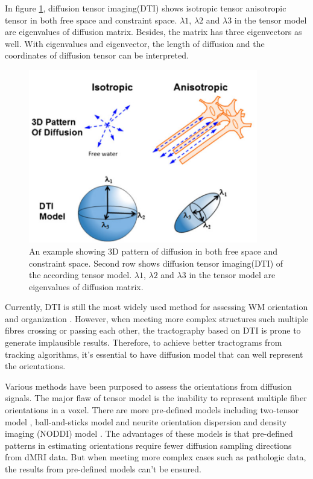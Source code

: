 In figure \ref*{fig:DTI}, diffusion tensor imaging(DTI) shows isotropic tensor anisotropic tensor in 
both free space and constraint space. 
$\lambda 1$, $\lambda 2$ and $\lambda 3$ in the tensor model are eigenvalues of diffusion matrix.
Besides, the matrix has three eigenvectors as well. With eigenvalues and eigenvector, the length of diffusion 
and the coordinates of diffusion tensor can be interpreted.

\begin{figure}[ht]
    \centering
    \includegraphics[width= 10cm]{figures/DTI.png}
        \caption{An example showing 3D pattern of diffusion in both free space and constraint space. 
        Second row shows diffusion tensor imaging(DTI) of the according tensor model. 
        $\lambda 1$, $\lambda 2$ and $\lambda 3$ in the tensor model are eigenvalues of diffusion matrix.}
    \label{fig:DTI}
\end{figure}

Currently, DTI is still the most widely used method for assessing WM orientation and organization \cite{basserEstimationEffectiveSelfDiffusion1994}.
However, when meeting more complex structures such multiple fibres crossing or passing each other, the tractography based on DTI is prone to 
generate implausible results. Therefore, to achieve better tractograms from tracking algorithms, it's essential to have diffusion model that can 
well represent the orientations. 

Various methods have been purposed to assess the orientations from diffusion signals.
The major flaw of tensor model is the inability to represent multiple fiber orientations in a voxel.
There are more pre-defined models including two-tensor model \cite*[]{qaziResolvingCrossingsCorticospinal2009}, ball-and-sticks model \cite*[]{behrensCharacterizationPropagationUncertainty2003}
and neurite orientation dispersion and density imaging (NODDI) model \cite*[]{zhangNODDIPracticalVivo2012}. 
The advantages of these models is that pre-defined patterns in estimating orientations require fewer diffusion sampling directions from dMRI data. 
But when meeting more complex cases such as pathologic data, the results from pre-defined models can't be ensured.

